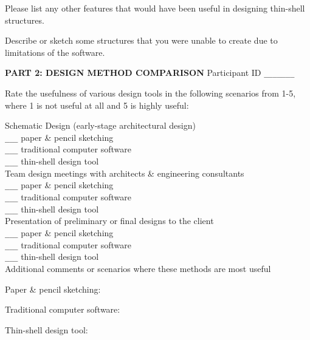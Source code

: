 \documentclass{thesis}
\begin{document}
Please list any other features that would have been useful in designing thin-shell structures.
\vspace{1.2in}




Describe or sketch some structures that you were unable to create due to limitations of the software.
\vspace{1in}



\newpage
{\bf PART 2: DESIGN METHOD COMPARISON} 
\hfill Participant ID \verb+_______+
\vspace{0.3in}

Rate the usefulness of various design tools in the following scenarios from 1-5,
where 1 is not useful at all and 5 is highly useful:


Schematic Design (early-stage architectural design)\\
\verb+___+ paper \& pencil sketching \\
\verb+___+ traditional computer software \\
\verb+___+ thin-shell design tool \\
Team design meetings with architects \& engineering consultants\\
\verb+___+ paper \& pencil sketching \\
\verb+___+ traditional computer software \\
\verb+___+ thin-shell design tool \\
Presentation of preliminary or final designs to the client\\
\verb+___+ paper \& pencil sketching \\
\verb+___+ traditional computer software \\
\verb+___+ thin-shell design tool \\


Additional comments or scenarios where these methods are most useful
\vspace{0.15in}

\hspace*{0.3in} 
Paper \& pencil sketching:
\vspace{0.7in}

\hspace*{0.3in} 
Traditional computer software:
\vspace{0.7in}

\hspace*{0.3in} 
Thin-shell design tool:
\vspace{0.7in}
\end{document}
